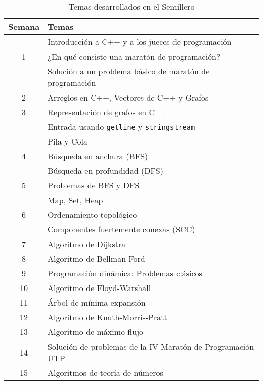 \documentclass[conference]{IEEEtran}
\begin{document}
\begin{table}
	\centering
	\begin{tabular}{|c|l|}
		\hline
		\textbf{Semana} & \textbf{Temas}\\
		\hline
		  & Introducción a C++ y a los jueces de programación \\
		1 & ¿En qué consiste una maratón de programación?\\
		  & Solución a un problema básico de maratón de programación\\
		\hline
		2 & Arreglos en C++, Vectores de C++ y Grafos\\
		\hline %
		3 & Representación de grafos en C++\\
		  & Entrada usando \verb|getline| y \verb|stringstream|\\
		\hline
		  & Pila y Cola\\
		4 & Búsqueda en anchura (BFS)\\
		  & Búsqueda en profundidad (DFS)\\
		\hline
		5 & Problemas de BFS y DFS\\
		\hline
		  & Map, Set, Heap\\
		6 & Ordenamiento topológico\\
		  & Componentes fuertemente conexas (SCC)\\
		\hline
		7 & Algoritmo de Dijkstra \\
		\hline 
		8 & Algoritmo de Bellman-Ford\\
		\hline 
		9 & Programación dinámica: Problemas clásicos\\
		\hline
		10 & Algoritmo de Floyd-Warshall\\
		\hline
		11 & Árbol de mínima expansión\\
		\hline
		12 & Algoritmo de Knuth-Morris-Pratt\\
		\hline
		13 & Algoritmo de máximo flujo\\
		\hline
		14 & Solución de problemas de la IV Maratón de Programación UTP\\
		\hline
		15 & Algoritmos de teoría de números\\
		\hline 
	\end{tabular}
	
	\quad \\
	\caption{Temas desarrollados en el Semillero}
	\label{Tabla:temas}
\end{table}
\end{document}
